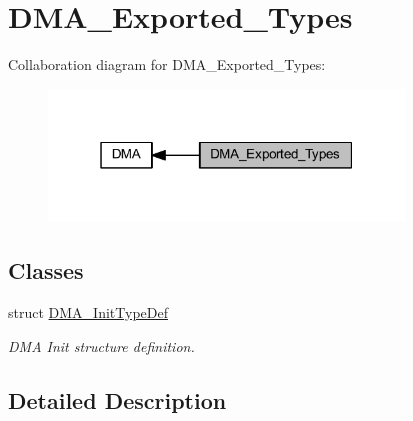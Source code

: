 \hypertarget{group___d_m_a___exported___types}{}\section{D\+M\+A\+\_\+\+Exported\+\_\+\+Types}
\label{group___d_m_a___exported___types}
Collaboration diagram for D\+M\+A\+\_\+\+Exported\+\_\+\+Types\+:
\nopagebreak
\begin{figure}[H]
\begin{center}
\leavevmode
\includegraphics[width=268pt]{group___d_m_a___exported___types}
\end{center}
\end{figure}
\subsection*{Classes}
\begin{DoxyCompactItemize}
\item 
struct \hyperlink{struct_d_m_a___init_type_def}{D\+M\+A\+\_\+\+Init\+Type\+Def}
\begin{DoxyCompactList}\small\item\em D\+MA Init structure definition. \end{DoxyCompactList}\end{DoxyCompactItemize}


\subsection{Detailed Description}
